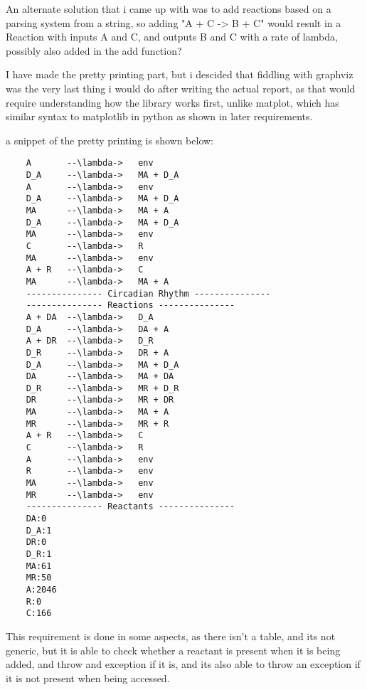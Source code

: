 An alternate solution that i came up with was to add reactions based on a parsing system from a string, so adding "A + C -> B + C" would result in a Reaction with inputs A and C, and outputs B and C with a rate of lambda, possibly also added in the add function?


I have made the pretty printing part, but i descided that fiddling with graphviz was the very last thing i would do after writing the actual report, as that would require understanding how the library works first, unlike matplot, which has similar syntax to matplotlib in python as shown in later requirements.

a snippet of the pretty printing is shown below:

\begin{lstlisting}
    A       --\lambda->   env
    D_A     --\lambda->   MA + D_A
    A       --\lambda->   env
    D_A     --\lambda->   MA + D_A
    MA      --\lambda->   MA + A
    D_A     --\lambda->   MA + D_A
    MA      --\lambda->   env
    C       --\lambda->   R
    MA      --\lambda->   env
    A + R   --\lambda->   C
    MA      --\lambda->   MA + A
    --------------- Circadian Rhythm ---------------
    --------------- Reactions ---------------
    A + DA  --\lambda->   D_A
    D_A     --\lambda->   DA + A
    A + DR  --\lambda->   D_R
    D_R     --\lambda->   DR + A
    D_A     --\lambda->   MA + D_A
    DA      --\lambda->   MA + DA
    D_R     --\lambda->   MR + D_R
    DR      --\lambda->   MR + DR
    MA      --\lambda->   MA + A
    MR      --\lambda->   MR + R
    A + R   --\lambda->   C
    C       --\lambda->   R
    A       --\lambda->   env
    R       --\lambda->   env
    MA      --\lambda->   env
    MR      --\lambda->   env
    --------------- Reactants ---------------
    DA:0
    D_A:1
    DR:0
    D_R:1
    MA:61
    MR:50
    A:2046
    R:0
    C:166
\end{lstlisting}


This requirement is done in some aspects, as there isn't a table, and its not generic, but it is able to check whether a reactant is present when it is being added, and throw and exception if it is, and its also able to throw an exception if it is not present when being accessed.


